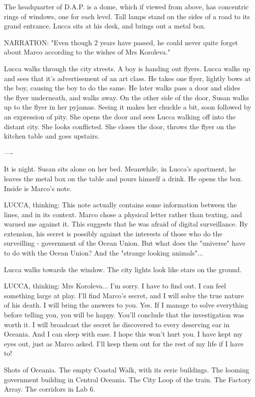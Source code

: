 \documentclass[11pt]{article}
\begin{document}
The headquarter of D.A.P. is a dome, which if viewed from above, has concentric rings of windows, one for each level. 
Tall lamps stand on the sides of a road to its grand entrance. 
Lucca sits at his desk, and brings out a metal box. 

NARRATION: "Even though 2 years have passed, he could never quite forget about Marco according to the wishes of Mrs Koroleva."

Lucca walks through the city streets. 
A boy is handing out flyers. Lucca walks up and sees that it's advertisement of an art class. 
He takes one flyer, lightly bows at the boy, causing the boy to do the same. 
He later walks pass a door and slides the flyer underneath, and walks away. 
On the other side of the door, Susan walks up to the flyer in her pyjamas. 
Seeing it makes her chuckle a bit, soon followed by an expression of pity. 
She opens the door and sees Lucca walking off into the distant city. 
She looks conflicted. 
She closes the door, throws the flyer on the kitchen table and goes upstairs.

----

It is night. Susan sits alone on her bed. 
Meanwhile, in Lucca's apartment, he leaves the metal box on the table and pours himself a drink. 
He opens the box. Inside is Marco's note. 

LUCCA, thinking: This note actually contains some information between the lines, and in its context. 
Marco chose a physical letter rather than texting, and warned me against it. 
This suggests that he was afraid of digital surveillance. 
By extension, his secret is possibly against the interests of those who do the surveilling - government of the Ocean Union. 
But what does the "universe" have to do with the Ocean Union?
And the "strange looking animals"... 

Lucca walks towards the window. The city lights look like stars on the ground. 

LUCCA, thinking: 
Mrs Koroleva... I'm sorry. I have to find out. I can feel something large at play. 
I'll find Marco's secret, and I will solve the true nature of his death. 
I will bring the answers to you. Yes. 
If I manage to solve everything before telling you, you will be happy. 
You'll conclude that the investigation was worth it. 
I will broadcast the secret he discovered to every deserving ear in Oceania.
And I can sleep with ease. 
I hope this won't hurt you. 
I have kept my eyes out, just as Marco asked. I'll keep them out for the rest of my life if I have to!

Shots of Oceania. 
The empty Coastal Walk, with its eerie buildings. 
The looming government building in Central Oceania. 
The City Loop of the train. 
The Factory Array.
The corridors in Lab 6.
\end{document}
